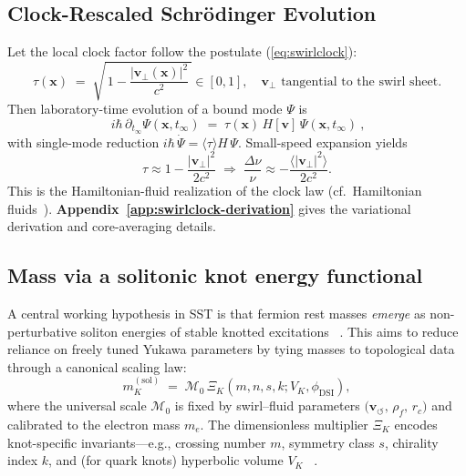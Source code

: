 \documentclass[10pt,reprint,aps,onecolumn,nofootinbib]{revtex4-2}
\begin{document}
        \subsection*{Clock-Rescaled Schrödinger Evolution}
            Let the local clock factor follow the postulate (\ref{eq:swirlclock}):
            \[
                \tau(\mathbf{x}) \;=\; \sqrt{\,1-\frac{|\mathbf{v}_\perp(\mathbf{x})|^{2}}{c^{2}}\,}\in[0,1],
                \quad \mathbf{v}_\perp \text{ tangential to the swirl sheet.}
            \]
            Then laboratory-time evolution of a bound mode \(\Psi\) is
            \[
                \boxed{~ i\hbar\,\partial_{t_\infty}\Psi(\mathbf{x},t_\infty)
                \;=\; \tau(\mathbf{x})\,H[\mathbf{v}]\,\Psi(\mathbf{x},t_\infty) ~},
            \]
            with single-mode reduction \(i\hbar\,\dot\Psi=\langle\tau\rangle H\,\Psi\).
            Small-speed expansion yields
            \[
                \tau \approx 1-\frac{|\mathbf{v}_\perp|^{2}}{2c^{2}}
                \;\Rightarrow\;
                \frac{\Delta\nu}{\nu} \approx -\frac{\langle|\mathbf{v}_\perp|^{2}\rangle}{2c^{2}}.
            \]
            This is the Hamiltonian-fluid realization of the clock law (cf.\ Hamiltonian fluids~\cite{Salmon1988,Morrison1998}).
            \textbf{Appendix~\ref{app:swirlclock-derivation}} gives the variational derivation and core-averaging details.


        \subsection*{Mass via a solitonic knot energy functional}
            A central working hypothesis in SST is that fermion rest masses \emph{emerge} as non-perturbative soliton energies of stable knotted excitations~ \cite{sstLagrangian}. This aims to reduce reliance on freely tuned Yukawa parameters by tying masses to topological data through a canonical scaling law:
            \begin{equation} \label{eq:masslaw}
                m_K^{(\mathrm{sol})} \;=\; \mathcal{M}_0 \,\Xi_K(m,n,s,k;V_K,\phi_{\mathrm{DSI}}),
            \end{equation}
            where the universal scale $\mathcal{M}_0$ is fixed by swirl–fluid parameters $\big(\mathbf{v}_{\!\boldsymbol{\circlearrowleft}},\,\rho_{\!f},\,r_c\big)$ and calibrated to the electron mass $m_e$. The dimensionless multiplier $\Xi_K$ encodes knot-specific invariants—e.g., crossing number $m$, symmetry class $s$, chirality index $k$, and (for quark knots) hyperbolic volume $V_K$~ \cite{sstLagrangian}.
\end{document}
